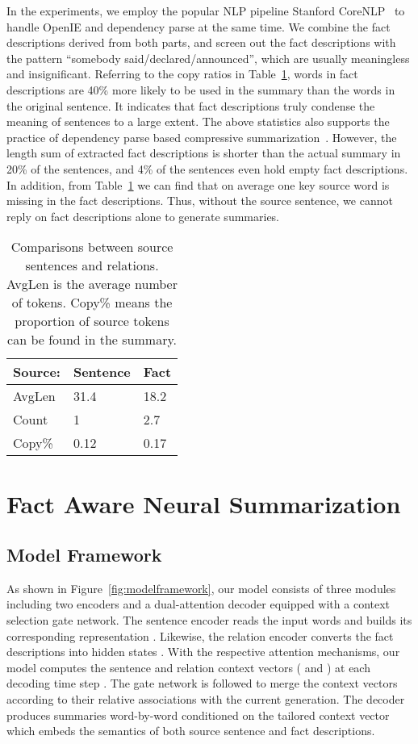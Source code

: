 \documentclass[letterpaper]{article} \usepackage{aaai18}  \usepackage{times}  \usepackage{helvet}  \usepackage{courier}  \usepackage{url}  \usepackage{graphicx}  \usepackage{amsfonts}
\begin{document}
	In the experiments, we employ the popular NLP pipeline Stanford CoreNLP~\cite{manning-EtAl:2014:P14-5} to handle OpenIE and dependency parse at the same time. 
	We combine the fact descriptions derived from both parts, and screen out the fact descriptions with the pattern ``somebody said/declared/announced'', which are usually meaningless and insignificant.
	Referring to the copy ratios in Table~\ref{tb:relation_info}, words in fact descriptions are 40\% more likely to be used in the summary than the words in the original sentence.
	It indicates that fact descriptions truly condense the meaning of sentences to a large extent.
	The above statistics also supports the practice of dependency parse based compressive summarization~\cite{knight2002summarization}.
	However, the length sum of extracted fact descriptions is shorter than the actual summary in 20\% of the sentences, and 4\% of the sentences even hold empty fact descriptions.
	In addition, from Table~\ref{tb:relation_info} we can find that on average one key source word is missing in the fact descriptions.
	Thus, without the source sentence, we cannot reply on fact descriptions alone to generate summaries. 
	
	\begin{table}[ht]
		\centering
		\begin{tabular}{l|ll}
			\hline
			Source:  & Sentence & Fact \\ \hline
			AvgLen   & 31.4     & 18.2      \\
			Count & 1        & 2.7       \\
			Copy\%  & 0.12      & 0.17         \\ \hline
		\end{tabular}
		\caption{Comparisons between source sentences and relations. AvgLen is the average number of tokens. Copy\% means the proportion of source tokens can be found in the summary.}
		\label{tb:relation_info}
	\end{table}
	
	\section{Fact Aware Neural Summarization}


	\subsection{Model Framework}
	As shown in Figure~\ref{fig:modelframework}, our model consists of three modules including two encoders and a dual-attention decoder equipped with a context selection gate network.
	The sentence encoder reads the input words
	 and builds its corresponding representation . 
	Likewise, the relation encoder converts the fact descriptions  into hidden states .
	With the respective attention mechanisms, our model computes the sentence and relation context vectors ( and ) at each decoding time step .
	The gate network is followed to merge the context vectors according to their relative associations with the current generation.
	The decoder produces summaries  word-by-word conditioned on the tailored context vector which embeds the semantics of both source sentence and fact descriptions.
	
\end{document}
